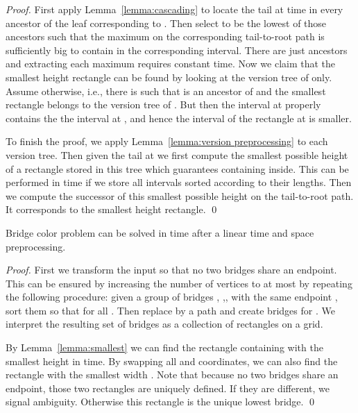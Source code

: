 \documentclass[runningheads]{llncs}
\begin{document}
\begin{proof}
First apply Lemma~\ref{lemma:cascading} to locate the tail at time  in every ancestor of the leaf corresponding to . Then select  to be the lowest of those ancestors such that the maximum on the corresponding tail-to-root path is sufficiently big to contain  in the corresponding interval. There are just  ancestors and extracting each maximum requires constant time. Now we claim that the smallest height rectangle can be found by looking at the version tree of  only.  Assume otherwise, i.e., there is  such that  is an ancestor of  and the smallest rectangle belongs to the version tree of . But then the  interval at  properly contains the the  interval at , and hence the interval of the rectangle at  is smaller.

To finish the proof, we apply Lemma~\ref{lemma:version preprocessing} to each version tree. Then given the tail at  we first compute the smallest possible height of a rectangle stored in this tree which guarantees containing  inside. This can be performed in  time if we store all  intervals sorted according to their lengths. Then we compute the successor of this smallest possible height on the tail-to-root path. It corresponds to the smallest height rectangle.
\qed
\end{proof}

\begin{theorem}
Bridge color problem can be solved in  time after a linear time and space preprocessing.
\end{theorem}

\begin{proof}
First we transform the input so that no two bridges share an endpoint. This can be ensured by increasing the number of vertices to at most  by repeating the following procedure: given a group of bridges ,  ,,  with the same endpoint , sort them so that  for all . Then replace  by a path  and create  bridges  for .  We interpret the resulting set of bridges as a collection of rectangles on a  grid.

By Lemma~\ref{lemma:smallest} we can find the rectangle  containing  with the smallest height  in  time. By swapping all  and  coordinates, we can also find the rectangle with the smallest width . Note that because no two bridges share an endpoint, those two rectangles are uniquely defined. If they are different, we signal ambiguity. Otherwise this rectangle is the unique lowest bridge. 
\qed
\end{proof}
\end{document}
